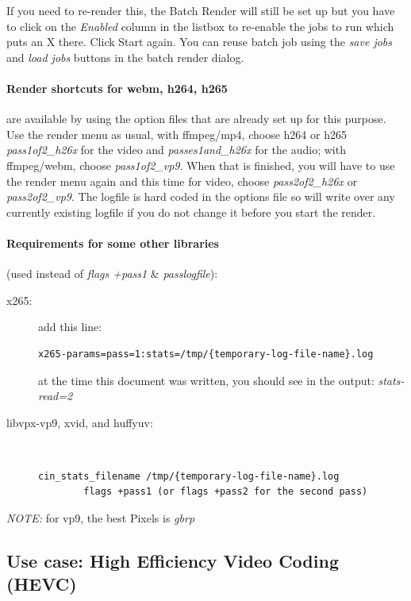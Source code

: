 If you need to re-render this, the Batch Render will still be set up
but you have to click on the \textit{Enabled} column in the listbox
to re-enable the jobs to run which puts an X there.  Click Start
again. You can reuse batch job using the \textit{save jobs} and
\textit{load jobs} buttons in the batch render dialog.

\paragraph{Render shortcuts for webm, h264, h265} are available by
using the option files that are already set up for this purpose.
Use the render menu as usual, with ffmpeg/mp4, choose h264 or h265
\textit{pass1of2\_h26x} for the video and
\textit{passes1and\_h26x} for the audio; with ffmpeg/webm, choose
\textit{pass1of2\_vp9}.  When that is finished, you will have to use
the render menu again and this time for video, choose
\textit{pass2of2\_h26x} or \textit{pass2of2\_vp9}.  The logfile is
hard coded in the options file so will write over any currently
existing logfile if you do not change it before you start the
render.

\paragraph{Requirements for some other libraries} (used instead
of \textit{flags +pass1} \& \textit{passlogfile}):
\begin{description}
	\item[x265:] add this line:
	\begin{lstlisting}[style=sh]
		x265-params=pass=1:stats=/tmp/{temporary-log-file-name}.log
	\end{lstlisting} at the time this document was written, you should
	see in the output: \textit{stats-read=2}
	\item[libvpx-vp9, xvid, and huffyuv:]~
	\begin{lstlisting}[style=sh]
		cin_stats_filename /tmp/{temporary-log-file-name}.log
		flags +pass1 (or flags +pass2 for the second pass)
	\end{lstlisting}
\end{description}

\textit{NOTE:} for vp9, the best Pixels is \textit{gbrp}

\subsection{Use case: High Efficiency Video Coding (HEVC)}%
\label{sub:use_case_hevc}

